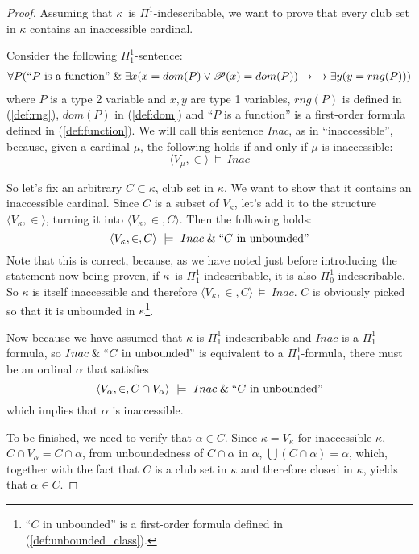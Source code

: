 \begin{proof}
Assuming that $\kappa$ is $\Pi^1_1$-indescribable, we want to prove that every club set in $\kappa$ contains an inaccessible cardinal. 

Consider the following $\Pi^1_1$-sentence:
\begin{equation}
\begin{gathered}\label{eq:inac}
\forall P (\mbox{``$P$ is a function''} \mathrel{\&} \exists x(x = dom(P) \lor \mathscr{P} (x) = dom(P)) \rightarrow\
\rightarrow \exists y(y = rng(P)))
\end{gathered}
\end{equation}
where $P$ is a type 2 variable and $x, y$ are type 1 variables, $rng(P)$ is defined in (\ref{def:rng}), $dom(P)$ in (\ref{def:dom}) and ``$P$ is a function'' is a first-order formula defined in (\ref{def:function}).
We will call this sentence \emph{Inac}, as in ``inaccessible'', because, given a cardinal $\mu$, the following holds if and only if $\mu$ is inaccessible:
\begin{equation}
\langle V_\mu, \in \rangle~\models~Inac %
\end{equation}

So let's fix an arbitrary $C \subset \kappa$, club set in $\kappa$. We want to show that it contains an inaccessible cardinal. Since $C$ is a subset of $V_\kappa$, let's add it to the structure $\langle V_\kappa, \in \rangle$, turning it into $\langle V_\kappa, \in, C \rangle$. Then the following holds:
\begin{equation}
\langle V_\kappa, \in, C \rangle~\models~Inac \mathrel{\&} \mbox{``$C$ in unbounded''}
\end{equation}
Note that this is correct, because, as we have noted just before introducing the statement now being proven, if $\kappa$ is $\Pi^1_1$-indescribable, it is also $\Pi^1_0$-indescribable. So $\kappa$ is itself inaccessible and therefore $\langle V_\kappa, \in, C \rangle~\models~Inac$. $C$ is obviously picked so that it is unbounded in $\kappa$\footnote{``$C$ in unbounded'' is a first-order formula defined in (\ref{def:unbounded_class}).}.

Now because we have assumed that $\kappa$ is $\Pi^1_1$-indescribable and $Inac$ is a $\Pi^1_1$-formula, so $Inac \mathrel{\&} \mbox{``$C$ in unbounded''}$ is equivalent to a $\Pi^1_1$-formula, there must be an ordinal $\alpha$ that satisfies
\begin{equation}
\langle V_\alpha, \in, C \cap V_\alpha \rangle~\models~Inac \mathrel{\&} \mbox{``$C$ in unbounded''}
\end{equation}
which implies that $\alpha$ is inaccessible. 

To be finished, we need to verify that $\alpha \in C$. Since $\kappa = V_\kappa$ for inaccessible $\kappa$, $C \cap V_\alpha = C \cap \alpha$, from unboundedness of $C \cap \alpha$ in $\alpha$, $\bigcup(C \cap \alpha) = \alpha$, which, together with the fact that $C$ is a club set in $\kappa$ and therefore closed in $\kappa$, yields that $\alpha \in C$.
\end{proof}



